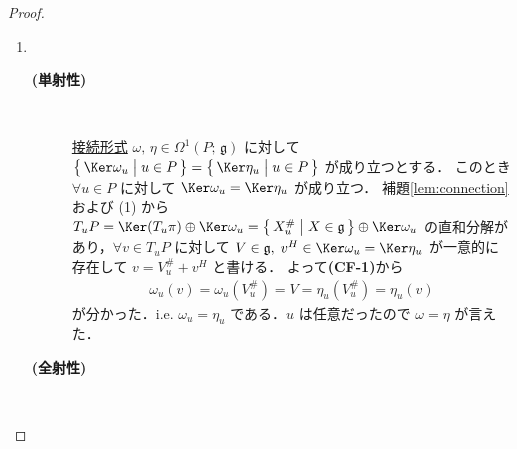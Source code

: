 \documentclass[TQFT_main]{subfiles}
\begin{document}
\begin{proof}
\begin{enumerate}
        \item　
        
        \begin{description}
            \item[\textbf{(単射性)}]　
            
            \hyperref[def:connection]{接続形式} $\omega,\, \eta \in \Omega^1(P;\, \mathfrak{g})$ に対して $\bigl\{\, \Ker \omega_u \bigm| u \in P \,\bigr\} = \bigl\{\, \Ker \eta_u \bigm| u \in P \,\bigr\}$ が成り立つとする．
            このとき $\forall u \in P$ に対して $\Ker \omega_u = \Ker \eta_u$ が成り立つ．
            補題\ref{lem:connection}および (1) から $T_u P = \Ker (T_u \pi) \oplus \Ker \omega_u = \bigl\{\, X^\#_u \bigm| X \in \mathfrak{g} \,\bigr\} \oplus \Ker \omega_u$ の直和分解があり，$\forall v \in T_u P$ に対して $V \in \mathfrak{g},\; v^H \in \Ker \omega_u = \Ker \eta_u$ が一意的に存在して $v = V^\#_u + v^H$ と書ける．
            よって\textbf{\textsf{(CF-1)}}から
            \begin{align}
                \omega_u(v) = \omega_u(V^\#_u) = V = \eta_u(V^\#_u) = \eta_u(v)
            \end{align}
            が分かった．i.e. $\omega_u = \eta_u$ である．$u$ は任意だったので $\omega = \eta$ が言えた．

            \item[\textbf{(全射性)}]　
            

\end{description}
\end{enumerate}
\end{proof}
\end{document}
